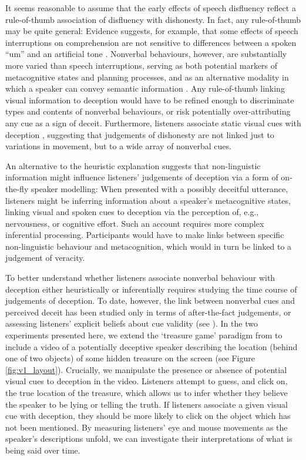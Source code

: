 \documentclass[a4paper,man,natbib]{apa6}
\newcommand*{\spex}[1]{``{#1}''} %
\begin{document}
It seems reasonable to assume that the early effects of speech disfluency reflect a rule-of-thumb association of disfluency with dishonesty.
In fact, any rule-of-thumb may be quite general:  Evidence suggests, for example, that some effects of speech interruptions on comprehension are not sensitive to differences between a spoken \spex{um} and an artificial tone \citep{Corley2011}.
Nonverbal behaviours, however, are substantially more varied than speech interruptions, serving as both potential markers of metacognitive states and planning processes, and as an alternative modality in which a speaker can convey semantic information \citep[See, e.g.][]{Ekman1969,Mcneill1992}.
Any rule-of-thumb linking visual information to deception would have to be refined enough to discriminate types and contents of nonverbal behaviours, or risk potentially over-attributing any cue as a sign of deceit.
Furthermore, listeners associate static visual cues with deception \citep[e.g. eye gaze,][]{Zuckerman1981a}, suggesting that judgements of dishonesty are not linked just to variations in movement, but to a wide array of nonverbal cues. 

An alternative to the heuristic explanation suggests that non-linguistic information might influence listeners' judgements of deception via a form of on-the-fly speaker modelling: 
When presented with a possibly deceitful utterance, listeners might be inferring information about a speaker's metacognitive states, linking visual and spoken cues to deception via the perception of, e.g., nervousness, or cognitive effort. 
Such an account requires more complex inferential processing.
Participants would have to make links between specific non-linguistic behaviour and metacognition, which would in turn be linked to a judgement of veracity.

To better understand whether listeners associate nonverbal behaviour with deception either heuristically or inferentially requires studying the time course of judgements of deception.
To date, however, the link between nonverbal cues and perceived deceit has been studied only in terms of after-the-fact judgements, or assessing listeners' explicit beliefs about cue validity (see \citealt{Vrij1996a, Zuckerman1981a}).
In the two experiments presented here, we extend the `treasure game' paradigm from \citet{Loy2017} to include a video of a potentially deceptive speaker describing the location (behind one of two objects) of some hidden treasure on the screen (see Figure \ref{fig:v1_layout}).
Crucially, we manipulate the presence or absence of potential visual cues to deception in the video.
Listeners attempt to guess, and click on, the true location of the treasure, which allows us to infer whether they believe the speaker to be lying or telling the truth.
If listeners associate a given visual cue with deception, they should be more likely to click on the object which has not been mentioned.
By measuring listeners' eye  and mouse movements as the speaker's descriptions unfold, we can investigate their interpretations of what is being said over time.
\end{document}
